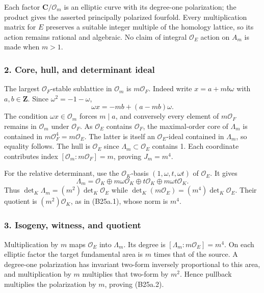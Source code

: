 \documentclass[11pt,a4paper]{article}
\theoremstyle{definition}
\begin{document}
Each factor \(\mathbf C/\mathcal O_m\) is an elliptic curve with its degree-one polarization; the product gives the asserted principally polarized fourfold. Every multiplication matrix for \(E\) preserves a suitable integer multiple of the homology lattice, so its action remains rational and algebraic. No claim of integral \(\mathcal O_E\) action on \(A_m\) is made when \(m>1\).

\subsubsection{2. Core, hull, and determinant ideal}\label{core-hull-and-determinant-ideal}

The largest \(\mathcal O_F\)-stable sublattice in \(\mathcal O_m\) is \(m\mathcal O_F\). Indeed write \(x=a+mb\omega\) with \(a,b\in\mathbf Z\). Since \(\omega^2=-1-\omega\), \[
 \omega x=-mb+(a-mb)\omega.
\] The condition \(\omega x\in\mathcal O_m\) forces \(m\mid a\), and conversely every element of \(m\mathcal O_F\) remains in \(\mathcal O_m\) under \(\mathcal O_F\). As \(\mathcal O_E\) contains \(\mathcal O_F\), the maximal-order core of \(\Lambda_m\) is contained in \(m\mathcal O_F^4=m\mathcal O_E\). The latter is itself an \(\mathcal O_E\)-ideal contained in \(\Lambda_m\), so equality follows. The hull is \(\mathcal O_E\) since \(\Lambda_m\subset\mathcal O_E\) contains 1. Each coordinate contributes index \([\mathcal O_m:m\mathcal O_F]=m\), proving \(J_m=m^4\).

For the relative determinant, use the \(\mathcal O_K\)-basis \((1,\omega,t,\omega t)\) of \(\mathcal O_E\). It gives \[
 \Lambda_m=\mathcal O_K\oplus m\omega\mathcal O_K
                    \oplus t\mathcal O_K\oplus m\omega t\mathcal O_K.
\] Thus \(\det_K\Lambda_m=(m^2)\det_K\mathcal O_E\) while \(\det_K(m\mathcal O_E)=(m^4)\det_K\mathcal O_E\). Their quotient is \((m^2)\mathcal O_K\), as in (B25a.1), whose norm is \(m^4\).

\subsubsection{3. Isogeny, witness, and quotient}\label{isogeny-witness-and-quotient}

Multiplication by \(m\) maps \(\mathcal O_E\) into \(\Lambda_m\). Its degree is \([\Lambda_m:m\mathcal O_E]=m^4\). On each elliptic factor the target fundamental area is \(m\) times that of the source. A degree-one polarization has invariant two-form inversely proportional to this area, and multiplication by \(m\) multiplies that two-form by \(m^2\). Hence pullback multiplies the polarization by \(m\), proving (B25a.2).
\end{document}
